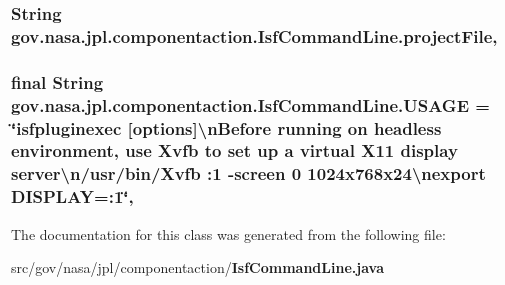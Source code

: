\subsubsection[{project\+File}]{\setlength{\rightskip}{0pt plus 5cm}String gov.\+nasa.\+jpl.\+componentaction.\+Isf\+Command\+Line.\+project\+File\hspace{0.3cm}{\ttfamily [static]}, {\ttfamily [package]}}\label{classgov_1_1nasa_1_1jpl_1_1componentaction_1_1_isf_command_line_a129160a912385063acbf5a084a10490a}
\subsubsection[{U\+S\+A\+GE}]{\setlength{\rightskip}{0pt plus 5cm}final String gov.\+nasa.\+jpl.\+componentaction.\+Isf\+Command\+Line.\+U\+S\+A\+GE = \char`\"{}isfpluginexec [options]\textbackslash{}n\+Before running on headless environment, use Xvfb to set up a virtual X11 display server\textbackslash{}n/usr/bin/Xvfb \+:1 -\/screen 0 1024x768x24\textbackslash{}nexport D\+I\+S\+P\+L\+A\+Y=\+:1\char`\"{}\hspace{0.3cm}{\ttfamily [static]}, {\ttfamily [private]}}\label{classgov_1_1nasa_1_1jpl_1_1componentaction_1_1_isf_command_line_a39d9a0269d69c1b26dc9878902ad698c}


The documentation for this class was generated from the following file\+:\begin{DoxyCompactItemize}
\item 
src/gov/nasa/jpl/componentaction/{\bf Isf\+Command\+Line.\+java}\end{DoxyCompactItemize}
